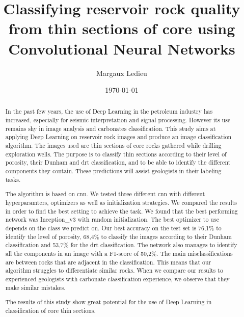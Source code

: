 \documentclass{kththesis}
\title{Classifying reservoir rock quality from thin sections of core using Convolutional Neural Networks}
\author{Margaux Ledieu}
\date{\today}
\begin{document}
\frontmatter

\titlepage

\begin{abstract}
In the past few years, the use of Deep Learning in the petroleum industry has increased, especially for seismic interpretation and signal processing. However its use remains shy in image analysis and carbonates classification. This study aims at applying Deep Learning on reservoir rock images and produce an image classification algorithm. The images used are thin sections of core rocks gathered while drilling exploration wells. The purpose is to classify thin sections according to their level of porosity, their Dunham and \gls{drt} classification, and to be able to identify the different components they contain. These predictions will assist geologists in their labeling tasks. 

The algorithm is based on \gls{cnn}. We tested three different \gls{cnn} with different hyperparamters, optimizers as well as initialization strategies. We compared the results in order to find the best setting to achieve the task.
We found that the best performing network was Inception\_v3 with random initialization. The best optimizer to use depends on the class we predict on. Our best accuracy on the test set is 76,1\% to identify the level of porosity, 68,4\% to classify the images according to their Dunham classification and 53,7\% for the \gls{drt} classification. The network also manages to identify all the components in an image with a F1-score of 50,2\%. 
The main misclassifications are between rocks that are adjacent in the classification. This means that our algorithm struggles to differentiate similar rocks. When we compare our results to experienced geologists with carbonate classification experience, we observe that they make similar mistakes.

The results of this study show great potential for the use of Deep Learning in classification of core thin sections. 
\end{abstract}
\end{document}

